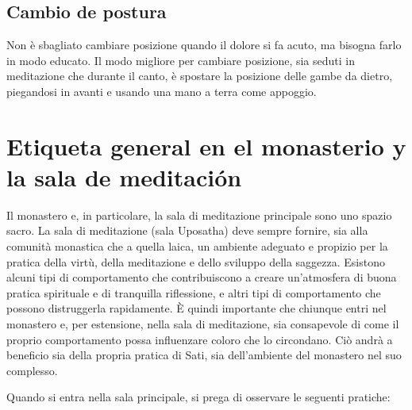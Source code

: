 \subsection{Cambio de postura}


Non è sbagliato cambiare posizione quando il dolore si fa acuto, ma bisogna farlo in modo educato. Il modo migliore per cambiare posizione, sia seduti in meditazione che durante il canto, è spostare la posizione delle gambe da dietro, piegandosi in avanti e usando una mano a terra come appoggio.
\clearpage

\section{Etiqueta general en el monasterio y la sala de meditación}

Il monastero e, in particolare, la sala di meditazione principale sono uno spazio sacro. La sala di meditazione (sala Uposatha) deve sempre fornire, sia alla comunità monastica che a quella laica, un ambiente adeguato e propizio per la pratica della virtù, della meditazione e dello sviluppo della saggezza. Esistono alcuni tipi di comportamento che contribuiscono a creare un'atmosfera di buona pratica spirituale e di tranquilla riflessione, e altri tipi di comportamento che possono distruggerla rapidamente. È quindi importante che chiunque entri nel monastero e, per estensione, nella sala di meditazione, sia consapevole di come il proprio comportamento possa influenzare coloro che lo circondano. Ciò andrà a beneficio sia della propria pratica di Sati, sia dell'ambiente del monastero nel suo complesso.

Quando si entra nella sala principale, si prega di osservare le seguenti pratiche:


